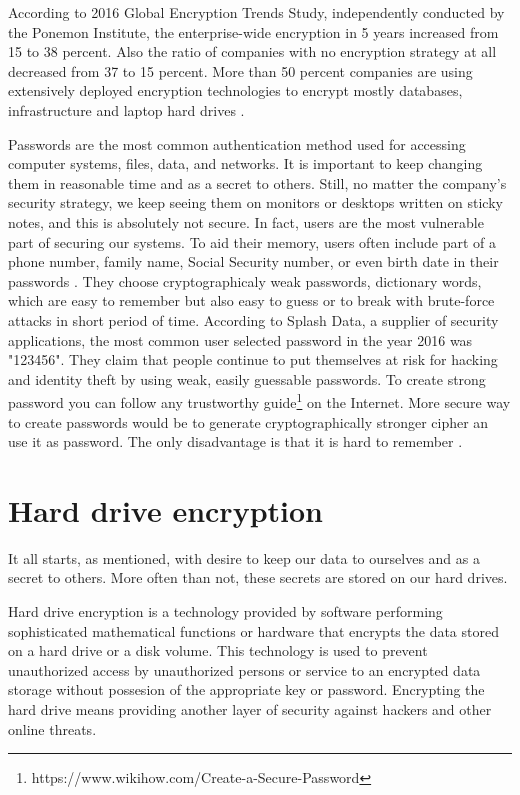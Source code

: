 According to 2016 Global Encryption Trends Study, independently conducted by the Ponemon Institute, the enterprise-wide encryption in 5 years increased from 15 to 38 percent.
Also the ratio of companies with no encryption strategy at all decreased from 37 to 15 percent.
More than 50 percent companies are using extensively deployed encryption technologies to encrypt mostly databases, infrastructure and laptop hard drives \cite{Thales}.

Passwords are the most common authentication method used for accessing computer systems, files, data, and networks.
It is important to keep changing them in reasonable time and as a secret to others.
Still, no matter the company's security strategy, we keep seeing them on monitors or desktops written on sticky notes, and this is absolutely not secure.
In fact, users are the most vulnerable part of securing our systems.
To aid their memory, users often include part of a phone number, family name, Social Security number, or even birth date in their passwords \cite{pwdsec}.
They choose cryptographicaly weak passwords, dictionary words, which are easy to remember but also easy to guess or to break with brute-force attacks in short period of time.
According to Splash Data, a supplier of security applications, the most common user selected password in the year 2016 was "123456".
They claim that people continue to put themselves at risk for hacking and identity theft by using weak, easily guessable passwords.
To create strong password you can follow any trustworthy guide\footnote{https://www.wikihow.com/Create-a-Secure-Password} on the Internet. %
More secure way to create passwords would be to generate cryptographically stronger cipher an use it as password.
The only disadvantage is that it is hard to remember \cite{splashdata}.



\section{Hard drive encryption}

It all starts, as mentioned, with desire to keep our data to ourselves and as a secret to others.
More often than not, these secrets are stored on our hard drives.

Hard drive encryption is a technology provided by software performing sophisticated mathematical functions or hardware that encrypts the data stored on a hard drive or a disk volume.
This technology is used to prevent unauthorized access by unauthorized persons or service to an encrypted data storage without possesion of the appropriate key or password.
Encrypting the hard drive means providing another layer of security against hackers and other online threats.

